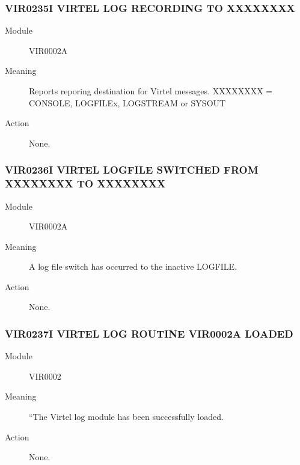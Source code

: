 \documentclass[letterpaper,10pt,english]{sphinxmanual}
\begin{document}
\subsubsection{VIR0235I VIRTEL LOG RECORDING TO XXXXXXXX}
\label{\detokenize{messages:vir0235i-virtel-log-recording-to-xxxxxxxx}}\begin{description}
\item[{Module}] \leavevmode
VIR0002A

\item[{Meaning}] \leavevmode
Reports reporing destination for Virtel messages. XXXXXXXX = CONSOLE, LOGFILEx, LOGSTREAM or SYSOUT

\item[{Action}] \leavevmode
None.

\end{description}


\subsubsection{VIR0236I VIRTEL LOGFILE SWITCHED FROM XXXXXXXX TO XXXXXXXX}
\label{\detokenize{messages:vir0236i-virtel-logfile-switched-from-xxxxxxxx-to-xxxxxxxx}}\begin{description}
\item[{Module}] \leavevmode
VIR0002A

\item[{Meaning}] \leavevmode
A log file switch has occurred to the inactive LOGFILE.

\item[{Action}] \leavevmode
None.

\end{description}


\subsubsection{VIR0237I VIRTEL LOG ROUTINE VIR0002A LOADED}
\label{\detokenize{messages:vir0237i-virtel-log-routine-vir0002a-loaded}}\begin{description}
\item[{Module}] \leavevmode
VIR0002

\item[{Meaning}] \leavevmode
“The Virtel log module has been successfully loaded.

\item[{Action}] \leavevmode
None.

\end{description}
\end{document}
